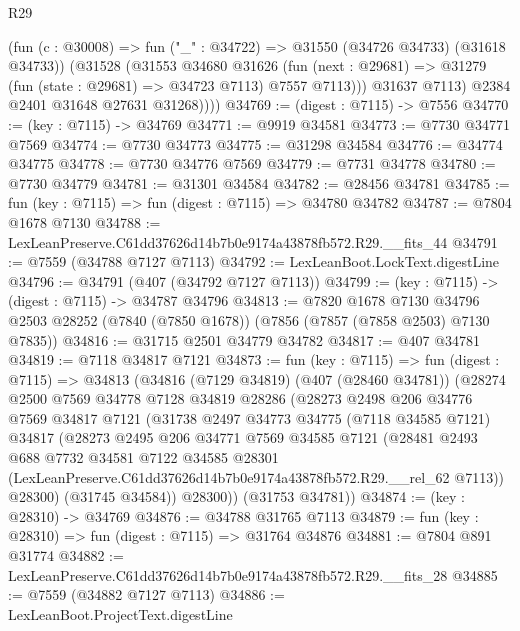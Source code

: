 \begin{lexlean}{R29}
\begin{coremodule}
              (fun (c : @30008) => fun ("_" : @34722) => @31550 (@34726 @34733) (@31618 @34733))
              (@31528
                (@31553
                  @34680
                  @31626
                  (fun (next : @29681) =>
                  @31279 (fun (state : @29681) => @34723 @7113) @7557 @7113)))
              @31637
              @7113)
            @2384
            @2401
            @31648
            @27631
            @31268))))
@34769 := (digest : @7115) -> @7556
@34770 := (key : @7115) -> @34769
@34771 := @9919 @34581
@34773 := @7730 @34771 @7569
@34774 := @7730 @34773
@34775 := @31298 @34584
@34776 := @34774 @34775
@34778 := @7730 @34776 @7569
@34779 := @7731 @34778
@34780 := @7730 @34779
@34781 := @31301 @34584
@34782 := @28456 @34781
@34785 := fun (key : @7115) => fun (digest : @7115) => @34780 @34782
@34787 := @7804 @1678 @7130
@34788 := LexLeanPreserve.C61dd37626d14b7b0e9174a43878fb572.R29.__fits_44
@34791 := @7559 (@34788 @7127 @7113)
@34792 := LexLeanBoot.LockText.digestLine
@34796 := @34791 (@407 (@34792 @7127 @7113))
@34799 := (key : @7115) -> (digest : @7115) -> @34787 @34796
@34813 := @7820
    @1678
    @7130
    @34796
    @2503
    @28252
    (@7840 (@7850 @1678))
    (@7856 (@7857 (@7858 @2503) @7130 @7835))
@34816 := @31715 @2501 @34779 @34782
@34817 := @407 @34781
@34819 := @7118 @34817 @7121
@34873 := fun (key : @7115) =>
  fun (digest : @7115) =>
  @34813
    (@34816
      (@7129 @34819)
      (@407 (@28460 @34781))
      (@28274
        @2500
        @7569
        @34778
        @7128
        @34819
        @28286
        (@28273
          @2498
          @206
          @34776
          @7569
          @34817
          @7121
          (@31738
            @2497
            @34773
            @34775
            (@7118 @34585 @7121)
            @34817
            (@28273
              @2495
              @206
              @34771
              @7569
              @34585
              @7121
              (@28481
                @2493
                @688
                @7732
                @34581
                @7122
                @34585
                @28301
                (LexLeanPreserve.C61dd37626d14b7b0e9174a43878fb572.R29.__rel_62 @7113))
              @28300)
            (@31745 @34584))
          @28300))
      (@31753 @34781))
@34874 := (key : @28310) -> @34769
@34876 := @34788 @31765 @7113
@34879 := fun (key : @28310) => fun (digest : @7115) => @31764 @34876
@34881 := @7804 @891 @31774
@34882 := LexLeanPreserve.C61dd37626d14b7b0e9174a43878fb572.R29.__fits_28
@34885 := @7559 (@34882 @7127 @7113)
@34886 := LexLeanBoot.ProjectText.digestLine

\end{coremodule}
\end{lexlean}
